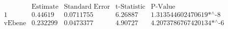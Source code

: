 \[\begin{array}{l|llll}
 \text{} & \text{Estimate} & \text{Standard Error} & \text{t-Statistic} & \text{P-Value} \\
\hline
 1 & 0.44619 & 0.0711755 & 6.26887 & \text{1.313544602470619$\grave{ }$*${}^{\wedge}$-8} \\
 \text{vEbene} & 0.232299 & 0.0473377 & 4.90727 & \text{4.2073786767420134$\grave{ }$*${}^{\wedge}$-6} \\
\end{array}\]

